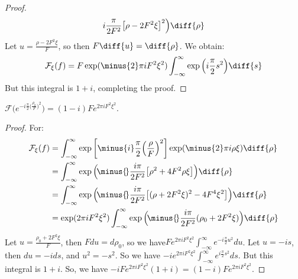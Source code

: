 \documentclass[crop=false,class=book,oneside]{standalone}
\begin{document}
\begin{proof}
\begin{equation}
\begin{split}
                        i\frac{\pi}{2F^2}
                        \big[\rho-2F^{2}\xi\big]^{2}
                    \Big)\diff{\rho}
                \end{split}
            \end{equation}
            Let $u=\frac{\rho-2F^{2}\xi}{F}$, so then
            $F\diff{u}=\diff{\rho}$. We obtain:
            \begin{equation}
                \mathcal{F}_{\xi}(f)
                =F\exp(\minus{2}\pi{i}F^{2}\xi^{2})
                    \int_{-\infty}^{\infty}
                    \exp\Big(i\frac{\pi}{2}s^{2}\Big)\diff{s}
            \end{equation}
            But this integral is $1+i$, completing the proof.
            \end{proof}
            \begin{theorem}
            $\mathcal{F}(e^{-i\frac{\pi}{2}\big(\frac{\rho_0}{F}\big)^2}\big) = (1-i)Fe^{2\pi i F^2 \xi^2}$.
            \end{theorem}
            \begin{proof}
            For:
            \begin{align}
                \mathcal{F}_{\xi}(f)
                &=\int_{-\infty}^{\infty}
                    \exp\bigg[
                        \minus{i}\frac{\pi}{2}
                        \Big(\frac{\rho}{F}\Big)^2
                    \bigg]
                    \exp(\minus{2}\pi{i}\rho\xi)\diff{\rho}\\
                &=\int_{-\infty}^{\infty}
                    \exp\Big(
                        {\!}\minus{\!}\frac{i\pi}{2F^{2}}
                        \big[
                            {\rho}^{2}+4F^{2}\rho\xi
                        \big]\Big)\diff{\rho}\\
                &=\int_{-\infty}^{\infty}
                    \exp\Big(
                        {\!}\minus{\!}\frac{i\pi}{2F^{2}}
                        \big[
                            (\rho+2F^{2}\xi)^2-4F^{4}\xi^{2}
                        \big]
                    \Big)\diff{\rho}\\
                &=\exp(2\pi{i}F^{2}\xi^{2})\int_{-\infty}^{\infty}
                    \exp\Big(
                        {\!}\minus{\!}\frac{i\pi}{2F^2}
                        (\rho_0+2F^2\xi)
                    \Big)\diff{\rho}
            \end{align}
            Let $u = \frac{\rho_0 + 2F^2 \xi}{F}$, then
            $Fdu = d\rho_0$, so we have$Fe^{2\pi i F^2 \xi^2} \int_{-\infty}^{\infty} e^{-i\frac{\pi}{2}u^2}du$.
            Let $u = -is$, then $du = -ids$, and $u^2 = -s^2$. So
            we have $-i e^{2\pi i F^2 \xi^2}\int_{-\infty}^{\infty} e^{i\frac{\pi}{2}s^2}ds$.
            But this integral is $1+i$. So, we have
            $-iFe^{2\pi iF^2\xi^2}(1+i)=(1-i)Fe^{2\pi iF^2 \xi^2}$.
            \end{proof} 
\end{document}
